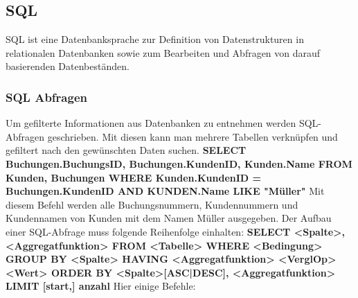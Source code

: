 \documentclass[12pt,a4paper]{article}
\begin{document}
\subsection{SQL}
    SQL ist eine Datenbanksprache zur Definition von Datenstrukturen in relationalen Datenbanken sowie zum Bearbeiten und Abfragen von darauf basierenden Datenbeständen.

\subsubsection{SQL Abfragen}
    Um gefilterte Informationen aus Datenbanken zu entnehmen werden SQL-Abfragen geschrieben. Mit diesen kann man mehrere Tabellen verknüpfen und gefiltert nach den gewünschten Daten suchen.\newline
    \vspace{0.5cm}\newline
    \textbf{SELECT Buchungen.BuchungsID, Buchungen.KundenID, \newline
    Kunden.Name FROM Kunden, Buchungen\newline
    WHERE Kunden.KundenID = Buchungen.KundenID\newline
    AND KUNDEN.Name LIKE "Müller"\newline}
    \vspace{0.5cm}\newline
    Mit diesem Befehl werden alle Buchungsnummern, Kundennummern und 
    Kundennamen von Kunden mit dem Namen Müller ausgegeben.\newline
    \vspace{1cm}\newline
    Der Aufbau einer SQL-Abfrage muss folgende Reihenfolge einhalten:\newline
    \textbf{SELECT <Spalte>,<Aggregatfunktion>\newline
    FROM <Tabelle>\newline
    WHERE <Bedingung>\newline
    GROUP BY <Spalte>\newline
    HAVING <Aggregatfunktion> <VerglOp> <Wert>\newline
    ORDER BY <Spalte>[ASC|DESC], <Aggregatfunktion>\newline
    LIMIT [start,] anzahl}\newline
    \vspace{1cm}\newline
    Hier einige Befehle:
\end{document}
